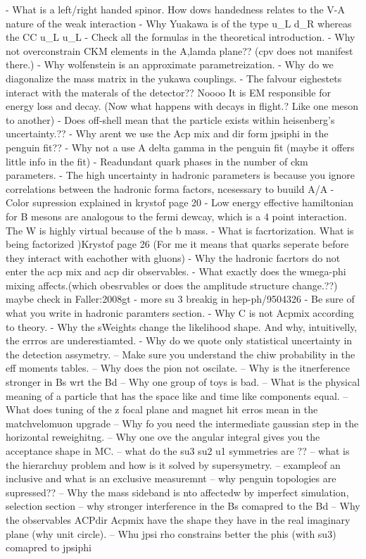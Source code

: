 - What is a left/right handed spinor. How dows handedness relates to the V-A nature of the weak interaction
- Why Yuakawa is of the type u_L d_R whereas the CC u_L u_L
- Check all the formulas in the theoretical introduction.
- Why not overconstrain CKM elements in the A,lamda plane?? (cpv does not manifest there.)
- Why wolfenstein is an approximate parametreization.
- Why do we diagonalize the mass matrix in the yukawa couplings.
- The falvour eighestets interact with the materals of the detector?? Noooo
  It is EM responsible for energy loss and decay. (Now what happens with decays in flight.? Like one meson to another)
- Does off-shell mean that the particle exists within heisenberg's uncertainty.??
- Why arent we use the Acp mix and dir form jpsiphi in the penguin fit??
- Why not a use A delta gamma in the penguin fit (maybe it offers little info in the fit)
- Readundant quark phases in the number of ckm parameters.
- The high uncertainty in hadronic parameters is because you ignore correlations between the hadronic forma factors, ncesessary to buuild A/A
- Color supression  explained in krystof page 20
- Low energy effective hamiltonian for B mesons are analogous to the fermi dewcay, which is a 4 point interaction. The W is highly virtual because of the b mass.
- What is facrtorization. What is being factorized )Krystof page 26 (For me it means that quarks seperate before they interact with eachother with gluons)
- Why the hadronic facrtors do not enter the acp mix and acp dir observables.
- What exactly does the wmega-phi mixing affects.(which obesrvables or does the amplitude structure change.??)  maybe check in  {Faller:2008gt}
- more su 3 breakig in hep-ph/9504326
- Be sure of what you write in hadronic paramters section.
- Why C is not Acpmix according to theory.
- Why the sWeights change the likelihood shape. And why, intuitivelly, the errros are underestiamted.
- Why do we quote only statistical uncertainty in the detection assymetry.
-- Make sure you understand the chiw probability in the eff moments tables.
-- Why does the pion not oscilate.
-- Why is the itnerference stronger in Bs wrt the Bd
-- Why one group of toys is bad.
-- What is the physical meaning of a particle that has the space like and time like components equal.
-- What does tuning of the z focal plane and magnet hit erros mean in the matchvelomuon upgrade
-- Why fo you need the intermediate gaussian step in the horizontal reweighitng.
-- Why one ove the angular \pdf integral gives you the acceptance shape in MC.
-- what do the su3 su2 u1 symmetries are ??
-- what is the hierarchuy problem and how is it solved by supersymetry.
-- exampleof an inclusive and what is an exclusive measuremnt 
-- why penguin topologies are supressed??
-- Why the mass sideband is nto affectedw by imperfect simulation, selection section 
-- why stronger interference in the Bs comapred to the Bd
-- Why the observables ACPdir Acpmix have the shape they have in the real imaginary plane (why unit circle).
-- Whu jpsi rho constrains better the phis (with su3) comapred to jpsiphi

